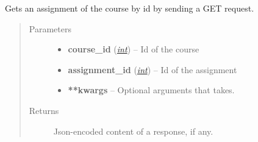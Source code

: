 \documentclass[letterpaper,10pt,english]{sphinxmanual}
\begin{document}

\begin{fulllineitems}
\label{web_portal:core.courses.api.get_assignment}
Gets an assignment of the course by id by sending a GET request.
\begin{quote}\begin{description}
\item[{Parameters}] \leavevmode\begin{itemize}
\item {} 
\textbf{course\_id} (\href{http://docs.python.org/library/functions.html\#int}{\emph{int}}) -- Id of the course

\item {} 
\textbf{assignment\_id} (\href{http://docs.python.org/library/functions.html\#int}{\emph{int}}) -- Id of the assignment

\item {} 
\textbf{**kwargs} -- Optional arguments that  takes.

\end{itemize}

\item[{Returns}] \leavevmode
Json-encoded content of a response, if any.

\end{description}\end{quote}

\end{fulllineitems}

\end{document}
